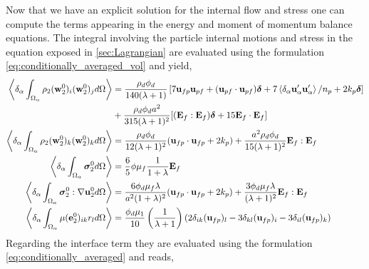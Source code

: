 Now that we have an explicit solution for the internal flow and stress one can compute the terms appearing in the energy and moment of momentum balance equations. 
The integral involving the particle internal motions and stress in the equation exposed in \ref{sec:Lagrangian} are evaluated using the formulation \ref{eq:conditionally_averaged_vol} and yield, 
\begin{align*}
    \left<\delta_\alpha \int_{\Omega_{\alpha}} \rho_2(\textbf{w}_2^0)_i (\textbf{w}_2^0)_j d\Omega\right>
    &= \frac{\rho_d \phi_d}{140(\lambda +1 )}
    \left[
        7\textbf{u}_{fp}\textbf{u}_{pf} 
    + (\textbf{u}_{pf}\cdot \textbf{u}_{pf})\bm\delta
    + 7\left<\delta_\alpha \textbf{u}_\alpha'\textbf{u}_\alpha'\right>/n_p 
    + 2k_p \bm\delta
    \right]\\
    &+ \frac{\rho_d \phi_d a^2}{315 (\lambda + 1)^2}[(\textbf{E}_f : \textbf{E}_f)\bm\delta+15\textbf{E}_f\cdot \textbf{E}_f]
\\
    \left<\delta_\alpha \int_{\Omega_{\alpha}} \rho_2(\textbf{w}_2^0)_k (\textbf{w}_2^0)_k d\Omega\right>
    &=  \frac{\rho_d \phi_d}{12 (\lambda +1)^2}
    (\textbf{u}_{fp} \cdot \textbf{u}_{fp} + 2 k_p)
    + \frac{a^2 \rho_d \phi_d}{15(\lambda+1)^2}
    \textbf{E}_f:\textbf{E}_f    \\
    \left<\delta_\alpha \int_{\Omega_{\alpha}} \bm\sigma_2^0 d\Omega\right>
    &= \frac{6}{5}\phi \mu_f \frac{1}{1+\lambda} \textbf{E}_f
\\
    \left<\delta_\alpha \int_{\Omega_{\alpha}} \bm{\sigma}_2^0:\mathbf{\nabla} \textbf{u}_2^0 d\Omega\right>
    &= 
    \frac{6 \phi_d \mu_f \lambda}{a^2(1+\lambda)^2}
    (\textbf{u}_{fp}\cdot \textbf{u}_{fp} + 2k_p)
    + \frac{3 \phi_d \mu_f \lambda}{(\lambda+1)^2}\textbf{E}_f:\textbf{E}_f
\\
    \left<\delta_\alpha \int_{\Omega_{\alpha}} \mu(\textbf{e}_2^0)_{ik} r_l d\Omega\right> &=
    \frac{\phi_d\mu_1}{10}\left(\frac{1}{\lambda+1}\right)
    \left(
        2\delta_{ik}(\textbf{u}_{fp})_l
        -3\delta_{kl}(\textbf{u}_{fp})_i
        -3\delta_{il}(\textbf{u}_{fp})_k
    \right)
\end{align*}
Regarding the interface term they are evaluated using the formulation \ref{eq:conditionally_averaged} and reads, 
